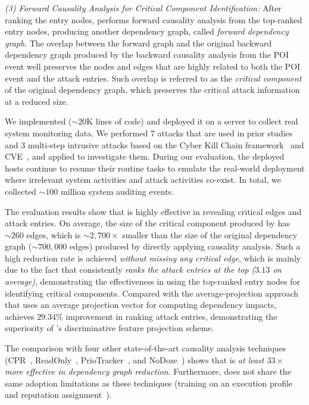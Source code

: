 \emph{(3) Forward Causality Analysis for Critical Component Identification:} 
After ranking the entry nodes, \tool performs forward causality analysis from the top-ranked entry nodes, producing another dependency graph, called \textit{forward dependency graph}.
The overlap between the forward graph and the original backward dependency graph produced by the backward causality analysis from the POI event well preserves the nodes and edges that are highly related to both the POI event and the attack entries.
Such overlap is referred to as the \emph{critical component} of the original dependency graph, which preserves the critical attack information at a reduced size.






We implemented \tool ($\sim$20K lines of code) and deployed it on a server to collect real system monitoring data.
We performed 7 attacks that are used in prior studies~\cite{exploitdb,liu2018priotracker,kwon2018mci,reduction} and 3 multi-step intrusive attacks based on the Cyber Kill Chain framework~\cite{cyberkillchain} and CVE~\cite{cve}, and applied \tool to investigate them.
%
During our evaluation, the deployed hosts continue to resume their routine tasks to emulate the real-world deployment where irrelevant system activities and attack activities co-exist.
In total, we collected ${\sim}100$ million system auditing events.

The evaluation results show that \tool is highly effective in revealing critical edges and attack entries.
On average, the size of the critical component produced by \tool has $\sim260$ edges, which is $\sim2,700\times$ smaller than the size of the original dependency graph ($\sim700,000$ edges) produced by directly applying causality analysis.
Such a high reduction rate is achieved \textit{without missing any critical edge}, which is mainly due to the fact that \tool consistently \textit{ranks the attack entries at the top ($3.13$ on average)}, demonstrating the effectiveness in using the top-ranked entry nodes for identifying critical components. 
Compared with the average-projection approach that uses an average projection vector for computing dependency impacts, \tool achieves $29.34\%$ improvement in ranking attack entries, demonstrating the superiority of \tool's discriminative feature projection scheme.

The comparison with four other state-of-the-art causality analysis techniques (CPR~\cite{reduction}, ReadOnly~\cite{loggc}, PrioTracker~\cite{liu2018priotracker}, and NoDoze~\cite{hassan2019nodoze}) shows that \tool is \textit{at least $33\times$ more effective in dependency graph reduction}. Furthermore, \tool does not share the same adoption limitations as these techniques (\eg training on an execution profile and reputation assignment~\cite{hassan2019nodoze}).


